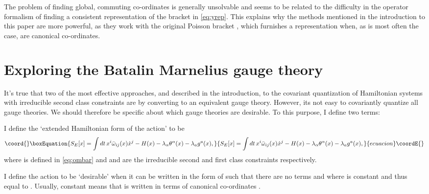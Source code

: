 \documentclass[a4paper,12pt]{article}
\theoremstyle{definition}
\theoremstyle{remark}
\numberwithin{equation}{section}
\providecommand{\al}{\alpha}
\providecommand{\ga}{\gamma}
\providecommand{\la}{\lambda}
\providecommand{\om}{\omega}
\providecommand{\dx}{\dot{x}}
\begin{document}
The problem of finding global, commuting co-ordinates
\myHighlight{$\hat{Q}^{\ga}$}\coordHE{} is generally unsolvable and seems to be related to
the difficulty in the operator formalism of finding a consistent
representation of the bracket in \eqref{eq:yrep}. This explains why
the methods mentioned in the introduction to this paper are more
powerful, as they work with the original Poisson bracket
\myHighlight{$\om^{ij}$}\coordHE{}, which furnishes a representation when, as is most often
the case, \coordHE{} are canonical co-ordinates.




\section{Exploring the Batalin Marnelius gauge theory}
\label{sec:exploreBM}

It's true that two of the most effective approaches,
\cite{Batalin:1987fm,Batalin:1990mb,Batalin:1991jm} and
\cite{Harada:1990aj,Mitra:1990mp} described in the introduction,
to the covariant quantization of Hamiltonian systems with
irreducible second class constraints are by converting to an
equivalent gauge theory. However, its not easy to covariantly
quantize all gauge theories. We should therefore be specific about
which gauge theories are desirable. To this purpose, I define two
terms:

I define the `extended Hamiltonian form of the action' to be
\begin{equation}\coord{}\boxEquation{ S_E[x]=\int{dt\, x^i \bar{\om}_{ij}(x) \dx^j -
H(x) -\la_{\al}\theta^{\al}(x) -\la_a g^a(x)},
}{ S_E[x]=\int{dt\, x^i \bar{\om}_{ij}(x) \dx^j -
H(x) -\la_{\al}\theta^{\al}(x) -\la_a g^a(x)},
}{ecuacion}\coordE{}\end{equation}
where \myHighlight{$\bar{\om}_{ij}(x)$}\coordHE{} is defined in \eqref{eq:ombar} and
\myHighlight{$\theta^{\al}(x)$}\coordHE{} and \coordHE{} are the irreducible second and first
class constraints respectively.

I define the action to be `desirable' when it can be written in the
form of \coordHE{} such that there are no \myHighlight{$\theta^{\al}(x)$}\coordHE{} terms and
where \myHighlight{$\om_{ij}$}\coordHE{} is constant and thus equal to \myHighlight{$2\bar{\om}_{ij}$}\coordHE{}.
Usually, constant \myHighlight{$\om_{ij}$}\coordHE{} means that \coordHE{} is written in
terms of canonical co-ordinates \coordHE{}.
\end{document}
